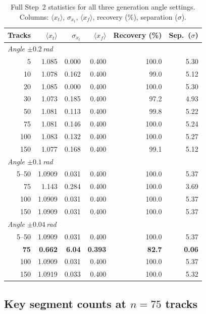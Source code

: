 \documentclass[12pt,a4paper]{article}
\begin{document}
\begin{table}[h!]
  \centering
  \caption{Full Step~2 statistics for all three generation angle settings.
           Columns: $\langle x_t\rangle$, $\sigma_{x_t}$,
           $\langle x_f\rangle$, recovery (\%), separation ($\sigma$).}
  \label{tab:step2_full}
  \small
  \begin{tabular}{r|rrrrr}
    \toprule
    Tracks & $\langle x_t\rangle$ & $\sigma_{x_t}$ & $\langle x_f\rangle$
    & Recovery (\%) & Sep.\ ($\sigma$) \\
    \midrule
    \multicolumn{6}{l}{\textit{Angle $\pm0.2$\,rad}} \\
    5    & 1.085  & 0.000 & 0.400 & 100.0 & 5.30 \\
    10   & 1.078  & 0.162 & 0.400 &  99.0 & 5.12 \\
    20   & 1.085  & 0.000 & 0.400 & 100.0 & 5.30 \\
    30   & 1.073  & 0.185 & 0.400 &  97.2 & 4.93 \\
    50   & 1.081  & 0.113 & 0.400 &  99.8 & 5.22 \\
    75   & 1.081  & 0.146 & 0.400 & 100.0 & 5.24 \\
    100  & 1.083  & 0.132 & 0.400 & 100.0 & 5.27 \\
    150  & 1.077  & 0.168 & 0.400 &  99.1 & 5.12 \\
    \midrule
    \multicolumn{6}{l}{\textit{Angle $\pm0.1$\,rad}} \\
    5–50 & 1.0909 & 0.031 & 0.400 & 100.0 & 5.37 \\
    75   & 1.143  & 0.284 & 0.400 & 100.0 & 3.69 \\
    100  & 1.0909 & 0.031 & 0.400 & 100.0 & 5.37 \\
    150  & 1.0909 & 0.031 & 0.400 & 100.0 & 5.37 \\
    \midrule
    \multicolumn{6}{l}{\textit{Angle $\pm0.04$\,rad}} \\
    5–50 & 1.0909 & 0.031 & 0.400 & 100.0 & 5.37 \\
    \textbf{75}   & \textbf{0.662}  & \textbf{6.04}  & \textbf{0.393}
    & \textbf{82.7} & \textbf{0.06} \\
    100  & 1.0909 & 0.031 & 0.400 & 100.0 & 5.37 \\
    150  & 1.0919 & 0.033 & 0.400 & 100.0 & 5.32 \\
    \bottomrule
  \end{tabular}
\end{table}

\subsection*{Key segment counts at $n=75$ tracks}
\end{document}
